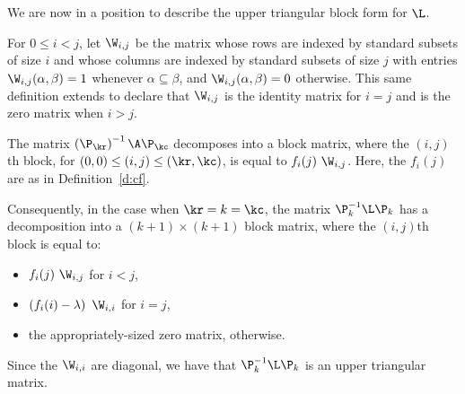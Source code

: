 We are now in a position to describe the upper triangular block form for $\L$.  

\begin{definition}
For $0 \leq i < j$, let $\W_{i,j}$ be the matrix whose rows are indexed by standard subsets of size $i$ and whose columns are indexed by standard subsets of size $j$ with entries $\W_{i,j}(\alpha, \beta) = 1$ whenever $\alpha \subseteq \beta$, and $\W_{i,j}(\alpha, \beta) = 0$ otherwise.  This same definition extends to declare that $\W_{i,j}$ is the identity matrix for $i = j$ and is the zero matrix when $i > j$.
\end{definition}

\begin{theorem}\label{t:p_matrix}
The matrix $\left(\P_{\kr}\right)^{-1} \A \P_{\kc}$ decomposes into a block matrix, where the $(i, j)$th block, for $(0, 0) \leq (i, j) \leq (\kr, \kc)$, is equal to $f_i(j) \ \W_{i,j}$.  Here, the $f_i(j)$ are as in Definition~\ref{d:cf}.

Consequently, in the case when $\kr = k = \kc$, the matrix $\P_k^{-1} \L \P_{k}$ has a decomposition into a $(k+1) \times (k+1)$ block matrix, where the $(i, j)$th block is equal to:
\begin{itemize}
    \item $f_{i}(j) \ \W_{i,j}$ for $i < j$,
    \item $\left(f_{i}(i) - \lambda\right) \ \W_{i,i}$ for $i = j$,
    \item the appropriately-sized zero matrix, otherwise.
\end{itemize}
Since the $\W_{i,i}$ are diagonal, we have that $\P_k^{-1} \L \P_k$ is an upper triangular matrix.
\end{theorem}
